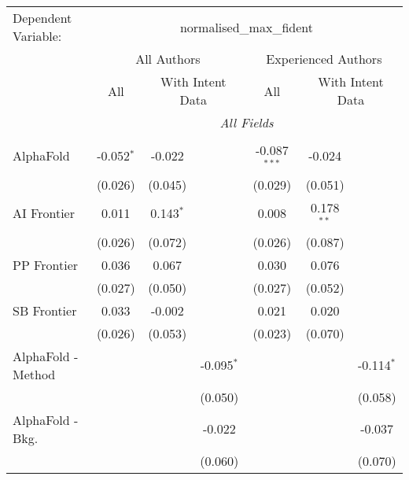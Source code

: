 \begingroup
\centering
\begin{tabular}{lcccccc}
   \tabularnewline \midrule \midrule
   Dependent Variable: & \multicolumn{6}{c}{normalised\_max\_fident}\\
 & \multicolumn{3}{c}{All Authors} & \multicolumn{3}{c}{Experienced Authors} \\
\cmidrule(lr){2-4} \cmidrule(lr){5-7}
 & \multicolumn{1}{c}{All} & \multicolumn{2}{c}{With Intent Data} & \multicolumn{1}{c}{All} & \multicolumn{2}{c}{With Intent Data} \\
\cmidrule(lr){2-2} \cmidrule(lr){3-4} \cmidrule(lr){5-5} \cmidrule(lr){6-7}
 & \multicolumn{6}{c}{\textit{All Fields}} \\ \\
   AlphaFold                     & -0.052$^{*}$ & -0.022      &               & -0.087$^{***}$ & -0.024       &   \\   
                                 & (0.026)      & (0.045)     &               & (0.029)        & (0.051)      &   \\   
   AI Frontier                   & 0.011        & 0.143$^{*}$ &               & 0.008          & 0.178$^{**}$ &   \\   
                                 & (0.026)      & (0.072)     &               & (0.026)        & (0.087)      &   \\   
   PP Frontier                   & 0.036        & 0.067       &               & 0.030          & 0.076        &   \\   
                                 & (0.027)      & (0.050)     &               & (0.027)        & (0.052)      &   \\   
   SB Frontier                   & 0.033        & -0.002      &               & 0.021          & 0.020        &   \\   
                                 & (0.026)      & (0.053)     &               & (0.023)        & (0.070)      &   \\   
   AlphaFold - Method            &              &             & -0.095$^{*}$  &                &              & -0.114$^{*}$\\   
                                 &              &             & (0.050)       &                &              & (0.058)\\   
   AlphaFold - Bkg.              &              &             & -0.022        &                &              & -0.037\\   
                                 &              &             & (0.060)       &                &              & (0.070)\\   

\end{tabular}

